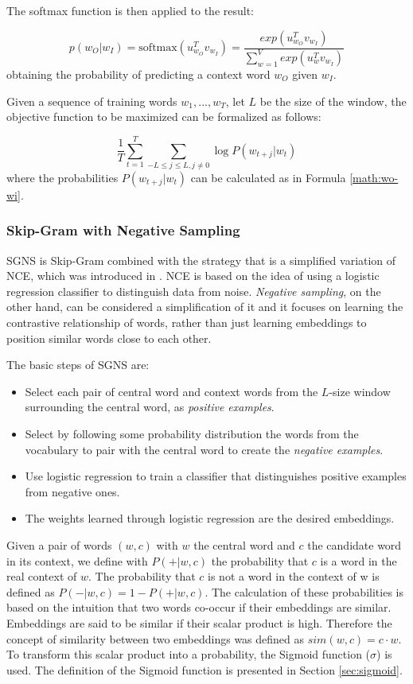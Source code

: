 The softmax function is then applied to the result:

\begin{equation}
\label{math:wo-wi}
p(w_O|w_I) = \text{softmax}(u_{w_O}^T v_{w_I}) = \frac{exp(u_{w_O}^T v_{w_I})}{\sum_{w=1}^{V} exp(u_w^T v_{w_I})}
\end{equation}
\noindent
obtaining the probability of predicting a context word $w_O$ given $w_I$.

Given a sequence of training words $w_1, ..., w_T$, let $L$ be the size of the window, the objective function to be maximized can be formalized as follows:

\[
\frac{1}{T}\sum_{t=1}^T \sum_{-L \leq j \leq L, j \neq 0} \log{P(w_{t+j} | w_t)}
\]
\noindent
where the probabilities $P(w_{t+j} | w_t)$ can be calculated as in Formula \ref{math:wo-wi}.

\subsubsection{Skip-Gram with Negative Sampling}

\ac{SGNS} is Skip-Gram combined with the strategy that is a simplified variation of \ac{NCE}, which was introduced in \cite{nce}. \ac{NCE} is based on the idea of using a logistic regression classifier to distinguish data from noise. \textit{Negative sampling}, on the other hand, can be considered a simplification of it and it focuses on learning the contrastive relationship of words, rather than just learning embeddings to position similar words close to each other.

The basic steps of \ac{SGNS} are:

\begin{itemize}
    \item Select each pair of central word and context words from the $L$-size window surrounding the central word, as \textit{positive examples}.
    \item Select by following some probability distribution the words from the vocabulary to pair with the central word to create the \textit{negative examples}.
    \item Use logistic regression to train a classifier that distinguishes positive examples from negative ones.
    \item The weights learned through logistic regression are the desired embeddings.
\end{itemize}

Given a pair of words $(w, c)$ with $w$ the central word and $c$ the candidate word in its context, we define with $P(+|w, c)$ the probability that $c$ is a word in the real context of $w$. The probability that $c$ is not a word in the context of w is defined as $P(-|w, c) = 1 - P(+|w, c)$. The calculation of these probabilities is based on the intuition that two words co-occur if their embeddings are similar. Embeddings are said to be similar if their scalar product is high. Therefore the concept of similarity between two embeddings was defined as $\mathit{sim}(w, c) = c \cdot w$. To transform this scalar product into a probability, the Sigmoid function ($\sigma$) is used. The definition of the Sigmoid function is presented in Section \ref{sec:sigmoid}.


